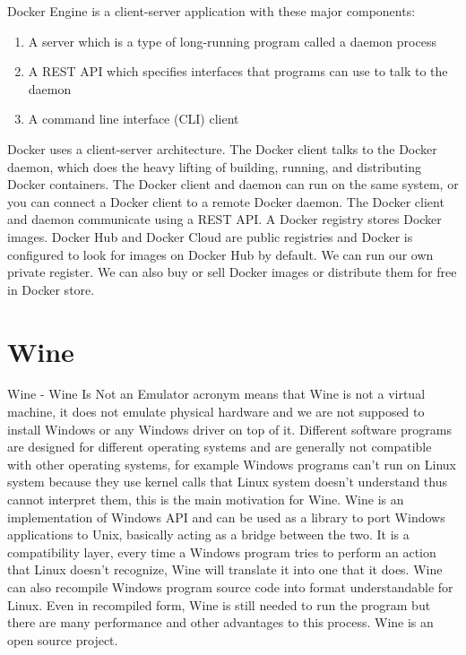 Docker Engine is a client-server application with these major components:
\begin{enumerate}
\item A server which is a type of long-running program called a daemon process
\item A REST API which specifies interfaces that programs can use to talk to the daemon
\item A command line interface (CLI) client
\end{enumerate}
Docker uses a client-server architecture. The Docker client talks to the Docker daemon, which does the heavy lifting of building, running, and distributing Docker containers. The Docker client and daemon can run on the same system, or you can connect a Docker client to a remote Docker daemon. The Docker client and daemon communicate using a REST API.
A Docker registry stores Docker images. Docker Hub and Docker Cloud are public registries and Docker is configured to look for images on Docker Hub by default. We can run our own private register. We can also buy or sell Docker images or distribute them for free in Docker store.


\section{Wine}
Wine - Wine Is Not an Emulator acronym means that Wine is not a virtual machine, it does not emulate physical hardware and we are not supposed to install Windows or any Windows driver on top of it. Different software programs are designed for different operating systems and are generally not compatible with other operating systems, for example Windows programs can't run on Linux system because they use kernel calls that Linux system doesn't understand thus cannot interpret them, this is the main motivation for Wine. Wine is an implementation of Windows API and can be used as a library to port Windows applications to Unix, basically acting as a bridge between the two. It is a compatibility layer, every time a Windows program tries to perform an action that Linux doesn't recognize, Wine will translate it into one that it does. Wine can also recompile Windows program source code into format understandable for Linux. Even in recompiled form, Wine is still needed to run the program but there are many performance and other advantages to this process. Wine is an open source project.

